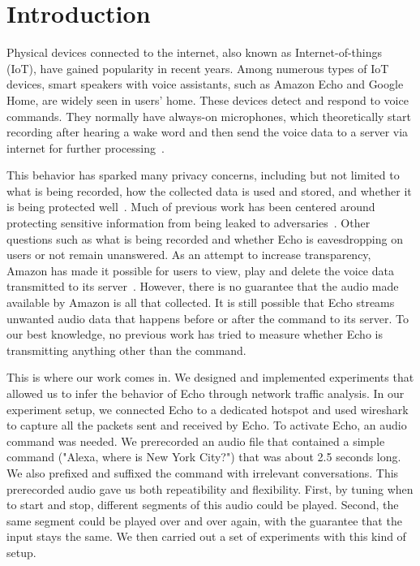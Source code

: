 \section{Introduction}
Physical devices connected to the internet, also known as Internet-of-things (IoT), have gained popularity in recent years. Among numerous types of IoT devices, smart speakers with voice assistants, such as Amazon Echo and Google Home, are widely seen in users' home. These devices detect and respond to voice commands. They normally have always-on microphones, which theoretically start recording after hearing a wake word and then send the voice data to a server via internet for further processing~\cite{AmazonEc68:online}.

This behavior has sparked many privacy concerns, including but not limited to what is being recorded, how the collected data is used and stored, and whether it is being protected well~\cite{lau2018alexa, fowler_2019, apthorpe2017smart, apthorpe2019keeping, apthorpe2017spying}. Much of previous work has been centered around protecting sensitive information from being leaked to adversaries~\cite{apthorpe2017smart, apthorpe2019keeping, apthorpe2017spying}. Other questions such as what is being recorded and whether Echo is eavesdropping on users or not remain unanswered. As an attempt to increase transparency, Amazon has made it possible for users to view, play and delete the voice data transmitted to its server~\cite{ford2019alexa}. However, there is no guarantee that the audio made available by Amazon is all that collected. It is still possible that Echo streams unwanted audio data that happens before or after the command to its server. To our best knowledge, no previous work has tried to measure whether Echo is transmitting anything other than the command.

This is where our work comes in. We designed and implemented experiments that allowed us to infer the behavior of Echo through network traffic analysis. In our experiment setup, we connected Echo to a dedicated hotspot and used wireshark to capture all the packets sent and received by Echo. To activate Echo, an audio command was needed. We prerecorded an audio file that contained a simple command ("Alexa, where is New York City?") that was about 2.5 seconds long. We also prefixed and suffixed the command with irrelevant conversations. This prerecorded audio gave us both repeatibility and flexibility. First, by tuning when to start and stop, different segments of this audio could be played. Second, the same segment could be played over and over again, with the guarantee that the input stays the same. We then carried out a set of experiments with this kind of setup.


